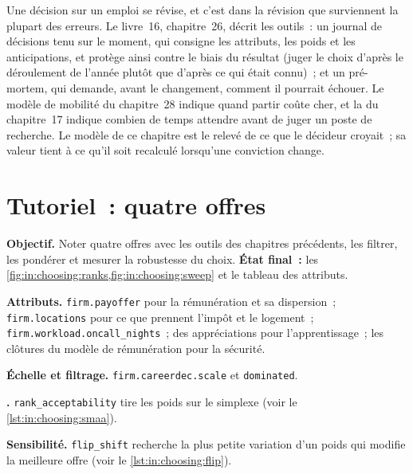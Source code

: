 Une décision sur un emploi se révise, et c'est dans la révision que surviennent la plupart des erreurs. Le livre~16, chapitre~26, décrit
les outils~: un journal de décisions tenu sur le moment, qui consigne les attributs, les poids et les anticipations, et protège ainsi contre le
biais du résultat (juger le choix d'après le déroulement de l'année plutôt que d'après ce qui était connu)~; et un pré-mortem, qui
demande, avant le changement, comment il pourrait échouer. Le modèle de mobilité du chapitre~28 indique quand partir coûte cher, et la  du chapitre~17
indique combien de temps attendre avant de juger un poste de recherche. Le modèle de ce chapitre est le relevé de ce que le décideur
croyait~; sa valeur tient à ce qu'il soit recalculé lorsqu'une conviction change.

\section{Tutoriel~: quatre offres}\label{tut:in:choosing:tut}

\begin{tutorial}
\textbf{Objectif.} Noter quatre offres avec les outils des chapitres précédents, les filtrer, les pondérer et mesurer la robustesse du choix.
\textbf{État final~:} les \cref{fig:in:choosing:ranks,fig:in:choosing:sweep} et le tableau des attributs.
\begin{tutsteps}
\item \textbf{Attributs.} \texttt{firm.payoffer} pour la rémunération et sa dispersion~; \texttt{firm.locations} pour ce que prennent l'impôt et
le logement~; \texttt{firm.workload.oncall\_nights}~; des appréciations pour l'apprentissage~; les clôtures du modèle de rémunération pour la sécurité.
\item \textbf{Échelle et filtrage.} \texttt{firm.careerdec.scale} et \texttt{dominated}.
\item \textbf{.} \texttt{rank\_acceptability} tire les poids sur le simplexe
(voir le \cref{lst:in:choosing:smaa}).
\label{lst:in:choosing:smaa}
\item \textbf{Sensibilité.} \texttt{flip\_shift} recherche la plus petite variation d'un poids qui modifie la meilleure offre
(voir le \cref{lst:in:choosing:flip}).
\label{lst:in:choosing:flip}
\end{tutsteps}
\end{tutorial}

